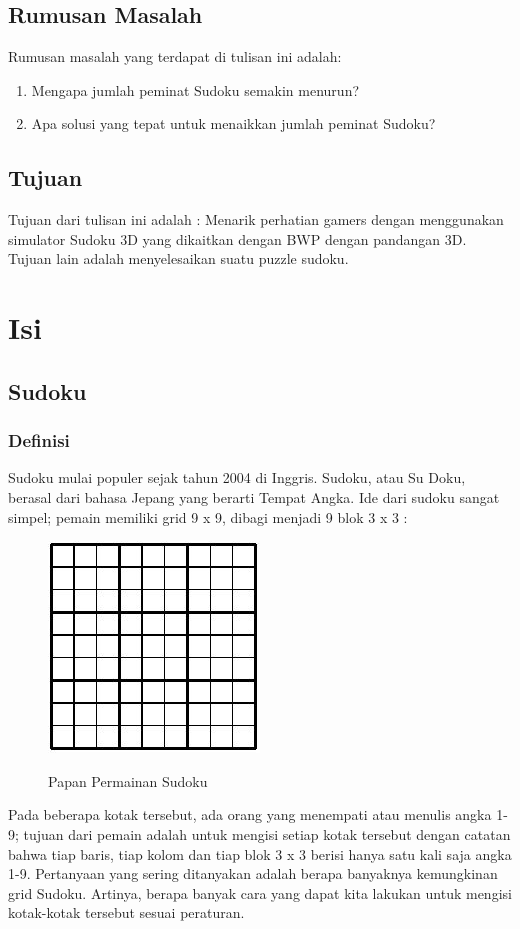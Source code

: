 \documentclass[11pt,a4paper]{report}
\begin{document}
\section{Rumusan Masalah}
Rumusan masalah yang terdapat di tulisan ini adalah:
\begin{enumerate}
	\item Mengapa jumlah peminat Sudoku semakin menurun?
	\item Apa solusi yang tepat untuk menaikkan jumlah peminat Sudoku?
\end{enumerate}

\section{Tujuan}
Tujuan dari tulisan ini adalah : Menarik perhatian gamers dengan menggunakan simulator Sudoku 3D yang dikaitkan dengan BWP dengan pandangan 3D. Tujuan lain adalah menyelesaikan suatu puzzle sudoku.

\chapter{Isi} %
\section{Sudoku}
\subsection{Definisi}
\indent Sudoku mulai populer sejak tahun 2004 di Inggris. Sudoku, atau Su Doku, berasal dari bahasa Jepang yang berarti Tempat Angka. Ide dari sudoku sangat simpel; pemain memiliki grid 9 x 9, dibagi menjadi 9 blok 3 x 3 :
\begin{figure}[h]
\centering
\includegraphics{sudoku}\\ \vspace{1cm}
\caption[Papan Permainan Sudoku]{Papan Permainan Sudoku} 
\end{figure}
Pada beberapa kotak tersebut, ada orang yang menempati atau menulis angka 1-9; tujuan dari pemain adalah untuk mengisi setiap kotak tersebut dengan catatan bahwa tiap baris, tiap kolom dan tiap blok 3 x 3 berisi hanya satu kali saja angka 1-9.
Pertanyaan yang sering ditanyakan adalah berapa banyaknya kemungkinan grid Sudoku. Artinya, berapa banyak cara yang dapat kita lakukan untuk mengisi kotak-kotak tersebut sesuai peraturan.
\end{document}
